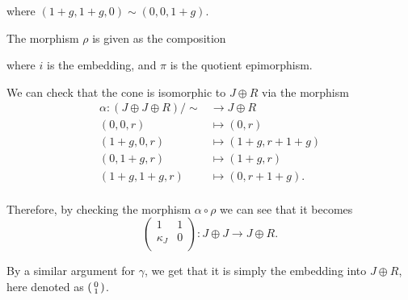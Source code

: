 \begin{example}
\begin{center}
	\end{center}
	where \( (1 + g, 1 + g, 0) \sim (0, 0, 1 + g) \).

	The morphism \( \rho \) is given as the composition
	\begin{center}
	\end{center}
	where \( i \) is the embedding, and \( \pi \) is the quotient epimorphism.

	We can check that the cone is isomorphic to \( J \oplus R \) via the morphism
	\begin{align*}
		\alpha: (J \oplus J \oplus R)/\sim &\to J \oplus R \\
		(0, 0, r) &\mapsto (0, r) \\
		(1 + g, 0, r) &\mapsto (1 + g, r + 1 + g) \\
		(0, 1 + g, r) &\mapsto (1 + g, r) \\
		(1 + g, 1 + g, r) &\mapsto (0, r + 1 + g). \\
	\end{align*}

	Therefore, by checking the morphism \( \alpha \circ \rho \) we can see that it becomes
	\[
		\begin{pmatrix}
			1 & 1 \\
			\kappa_J & 0 \\
		\end{pmatrix}
		: J \oplus J \to J \oplus R.
	\]

	By a similar argument for \( \gamma \), we get that it is simply the embedding into \( J \oplus R \), here denoted as \( \begin{psmallmatrix} 0 \\ 1 \\ \end{psmallmatrix} \).


\end{example}
